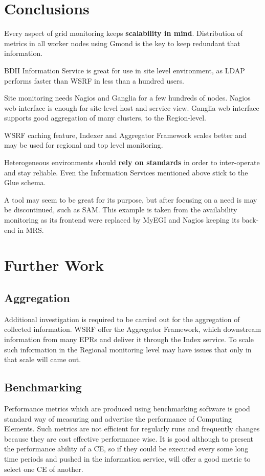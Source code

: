 \section{Conclusions}

Every aspect of grid monitoring keeps {\bf scalability in mind}. Distribution of metrics in all worker nodes using Gmond is the key to keep redundant that information.

BDII Information Service is great for use in site level environment, as LDAP performs faster than WSRF in less than a hundred users.

Site monitoring needs Nagios and Ganglia for a few hundreds of nodes. Nagios web interface is enough for site-level host and service view. Ganglia web interface supports good aggregation of many clusters, to the Region-level.

WSRF caching feature, Indexer and Aggregator Framework scales better and may be used for regional and top level monitoring.

Heterogeneous environments should {\bf rely on standards} in order to inter-operate and stay reliable. Even the Information Services mentioned above stick to the Glue schema.

A tool may seem to be great for its purpose, but after focusing on a need is may be discontinued, such as SAM. This example is taken from the availability monitoring as its frontend were replaced by MyEGI and Nagios keeping its back-end in MRS.

\section{Further Work}

\subsection{Aggregation}

Additional investigation is required to be carried out for the aggregation of collected information. WSRF offer the Aggregator Framework, which downstream information from many EPRs and deliver it through the Index service. To scale such information in the Regional monitoring level may have issues that only in that scale will came out.

\subsection{Benchmarking}

Performance metrics which are produced using benchmarking software is good standard way of measuring and advertise the performance of Computing Elements. Such metrics are not efficient for regularly runs and frequently changes because they are cost effective performance wise. It is good although to present the performance ability of a CE, so if they could be executed every some long time periods and pushed in the information service, will offer a good metric to select one CE of another.

